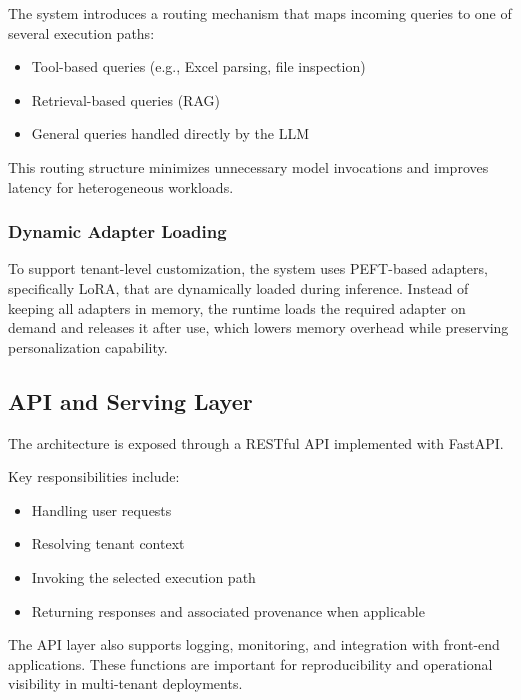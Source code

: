 The system introduces a routing mechanism that maps incoming queries to one of several execution paths:
\begin{itemize}
    \item Tool-based queries (e.g., Excel parsing, file inspection)
    \item Retrieval-based queries (RAG)
    \item General queries handled directly by the LLM
\end{itemize}

This routing structure minimizes unnecessary model invocations and improves latency for heterogeneous workloads.

\subsubsection{Dynamic Adapter Loading}

To support tenant-level customization, the system uses PEFT-based adapters, specifically LoRA, that are dynamically loaded during inference. Instead of keeping all adapters in memory, the runtime loads the required adapter on demand and releases it after use, which lowers memory overhead while preserving personalization capability.

\subsection{API and Serving Layer}

The architecture is exposed through a RESTful API implemented with FastAPI.

Key responsibilities include:
\begin{itemize}
    \item Handling user requests
    \item Resolving tenant context
    \item Invoking the selected execution path
    \item Returning responses and associated provenance when applicable
\end{itemize}

The API layer also supports logging, monitoring, and integration with front-end applications. These functions are important for reproducibility and operational visibility in multi-tenant deployments.
